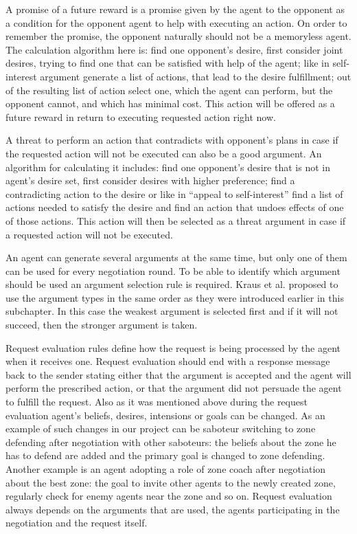 A promise of a future reward is a promise given by the agent to the opponent as a condition for the opponent agent to help with executing an action.
On order to remember the promise, the opponent naturally should not be a memoryless agent.
The calculation algorithm here is: find one opponent's desire, first consider joint desires, trying to find one that can be satisfied with help of the agent; like in self-interest argument generate a list of actions, that lead to the desire fulfillment; out of the resulting list of action select one, which the agent can perform, but the opponent cannot, and which has minimal cost.
This action will be offered as a future reward in return to executing requested action right now.

A threat to perform an action that contradicts with opponent's plans in case if the requested action will not be executed can also be a good argument.
An algorithm for calculating it includes: find one opponent's desire that is not in agent's desire set, first consider desires with higher preference; find a contradicting action to the desire or like in ``appeal to self-interest'' find a list of actions needed to satisfy the desire and find an action that undoes effects of one of those actions.
This action will then be selected as a threat argument in case if a requested action will not be executed.

An agent can generate several arguments at the same time, but only one of them can be used for every negotiation round.
To be able to identify which argument should be used an argument selection rule is required.
Kraus et al. \cite{Kraus_98} proposed to use the argument types in the same order as they were introduced earlier in this subchapter.
In this case the weakest argument is selected first and if it will not succeed, then the stronger argument is taken.

Request evaluation rules define how the request is being processed by the agent when it receives one.
Request evaluation should end with a response message back to the sender stating either that the argument is accepted and the agent will perform the prescribed action, or that the argument did not persuade the agent to fulfill the request.
Also as it was mentioned above during the request evaluation agent's beliefs, desires, intensions or goals can be changed.
As an example of such changes in our project can be saboteur switching to zone defending after negotiation with other saboteurs: the beliefs about the zone he has to defend are added and the primary goal is changed to zone defending.
Another example is an agent adopting a role of zone coach after negotiation about the best zone: the goal to invite other agents to the newly created zone, regularly check for enemy agents near the zone and so on.
Request evaluation always depends on the arguments that are used, the agents participating in the negotiation and the request itself.


